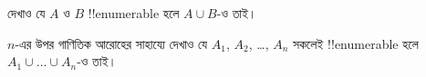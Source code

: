 \documentclass[../../../include/open-logic-section]{subfiles}
\begin{document}
\begin{prob}
দেখাও যে $A$ ও $B$ !!{enumerable} হলে $A \cup B$-ও তাই।
\end{prob}

\begin{prob}
$n$-এর উপর গাণিতিক আরোহের সাহায্যে দেখাও যে $A_1$, $A_2$, \dots, $A_n$ সকলেই !!{enumerable} হলে $A_1 \cup \dots \cup A_n$-ও তাই।
\end{prob}
\end{document}
